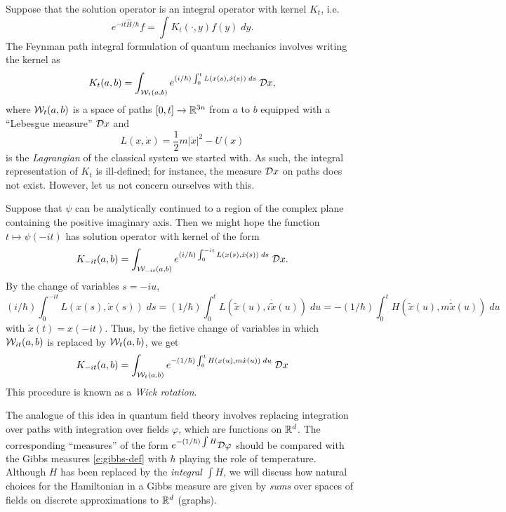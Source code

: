 Suppose that the solution operator is an integral operator with kernel $K_t$,
i.e.\
\begin{equation}
e^{-it\hat H/\hbar} f = \int K_t(\cdot, y) f(y) \; dy.
\end{equation}
The Feynman path integral formulation of quantum mechanics involves writing
the kernel as
\begin{equation}
K_t(a, b)
	=
\int_{\mathcal{W}_t(a, b)} e^{(i/\hbar) \int_0^t L(x(s), \dot x(s)) \; ds} \; \mathcal{D} x,
\end{equation}
where $\mathcal{W}_t(a, b)$ is a space of paths $[0, t] \rightarrow {\mathbb R}^{3n}$ from
$a$ to $b$ equipped with a ``Lebesgue measure'' $\mathcal{D} x$ and
\begin{equation}
L(x, \dot x) = \frac{1}{2} m |\dot x|^2 - U(x)
\end{equation}
is the \emph{Lagrangian} of the classical system we started with.
As such, the integral representation of $K_t$ is ill-defined;
for instance, the measure $\mathcal{D} x$ on paths does not exist. However, let us
not concern ourselves with this.

Suppose that $\psi$ can be analytically continued to a region of the complex
plane containing the positive imaginary axis. Then we might hope the function
$t \mapsto \psi(-it)$ has solution operator with kernel of the form
\begin{equation}
K_{-it}(a, b)
	=
\int_{\mathcal{W}_{-it}(a, b)} e^{(i/\hbar) \int_0^{-it} L(x(s), \dot x(s)) \; ds} \; \mathcal{D} x.
\end{equation}
By the change of variables $s = -iu$,
\begin{equation}
(i/\hbar) \int_0^{-it} L(x(s), \dot x(s)) \; ds
	=
(1/\hbar) \int_0^t L(\tilde x(u), i \dot{\tilde x}(u)) \; du
	=
-(1/\hbar) \int_0^t H(\tilde x(u), m \dot{\tilde x}(u)) \; du
\end{equation}
with $\tilde x(t) = x(-it)$. Thus, by the fictive change of variables in which
$\mathcal{W}_{it}(a, b)$ is replaced by $\mathcal{W}_t(a, b)$, we get
\begin{equation}
\label{e:heat-kernel-fake}
K_{-it}(a, b)
	=
\int_{\mathcal{W}_t(a, b)} e^{-(1/\hbar) \int_0^t H(x(u), m\dot x(u)) \; du} \; \mathcal{D} x
\end{equation}
This procedure is known as a \emph{Wick rotation}.

The analogue of this idea in quantum field theory involves replacing integration
over paths with integration over fields $\varphi$, which are functions on ${ {{\mathbb R}}^d}$.
The corresponding ``measures'' of the form $e^{-(1/\hbar)\int H} \mathcal{D}\varphi$
should be compared with the Gibbs measures \eqref{e:gibbs-def} with $\hbar$ playing
the role of temperature. Although $H$
has been replaced by the \emph{integral} $\int H$, we will discuss how natural
choices for the Hamiltonian in a Gibbs measure are given by \emph{sums} over
spaces of fields on discrete approximations to ${ {{\mathbb R}}^d}$ (graphs).


